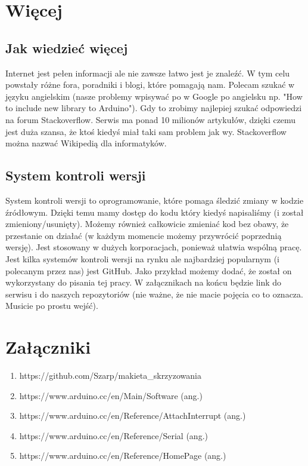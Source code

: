 \documentclass[a4paper,12pt, twoside]{article}
\let\oldsection\section		%
\renewcommand\section{\clearpage\oldsection}%
\begin{document}
\section {Więcej}

\subsection {Jak wiedzieć więcej}
Internet jest pełen informacji ale nie zawsze łatwo jest je znaleźć. W tym celu powstały różne fora, poradniki i blogi, które pomagają nam. Polecam szukać w języku angielskim (nasze problemy wpisywać po w Google po angielsku np. "How to include new library to Arduino"). Gdy to zrobimy najlepiej szukać odpowiedzi na forum Stackoverflow. Serwis ma ponad 10 milionów artykułów, dzięki czemu jest duża szansa, że ktoś kiedyś miał taki sam problem jak wy. Stackoverflow można nazwać Wikipedią dla informatyków. 
\subsection{System kontroli wersji}
System kontroli wersji to oprogramowanie, które pomaga śledzić zmiany w kodzie źródłowym.
Dzięki temu mamy dostęp do kodu który kiedyś napisaliśmy (i został zmieniony/usunięty). Możemy również całkowicie zmieniać kod bez obawy, że przestanie on działać (w każdym momencie możemy przywrócić poprzednią wersję). Jest stosowany w dużych korporacjach, ponieważ ułatwia wspólną pracę. Jest kilka systemów kontroli wersji na rynku ale najbardziej popularnym (i polecanym przez nas) jest GitHub. Jako przykład możemy dodać, że został on wykorzystany do pisania tej pracy. W załącznikach na końcu będzie link do serwisu i do naszych repozytoriów (nie ważne, że nie macie pojęcia co to oznacza. Musicie po prostu wejść).
\cite{SKW-Wiki, Git-Wiki}
\subsection{}

\section*{Załączniki}
\begin{enumerate}
	\item \label{itm:Git_makieta} https://github.com/Szarp/makieta\_skrzyzowania
	\item \label{itm:Download_Arduino} https://www.arduino.cc/en/Main/Software (ang.)
	\item \label{itm:InterruptPin} https://www.arduino.cc/en/Reference/AttachInterrupt (ang.)
	\item \label{itm:Serial} https://www.arduino.cc/en/Reference/Serial (ang.)
	\item \label{itm:Ref} https://www.arduino.cc/en/Reference/HomePage (ang.)
\end{enumerate}
\end{document}
